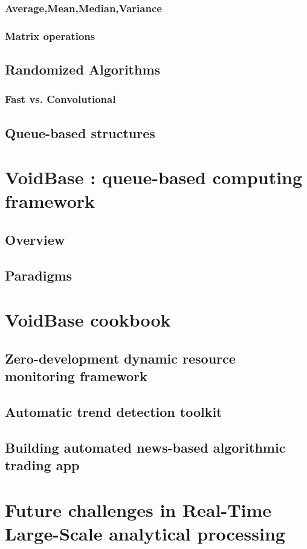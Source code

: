 \documentclass[]{book}    %
\begin{document}
\subsection{Average,Mean,Median,Variance}
\subsection{Matrix operations}

\section{Randomized Algorithms}
\subsection{Fast vs. Convolutional}
\section{Queue-based structures}

\chapter{VoidBase : queue-based computing framework}
\section{Overview}
\section{Paradigms}

\chapter{VoidBase cookbook}
\section{Zero-development dynamic resource monitoring framework}
\section{Automatic trend detection toolkit}
\section{Building automated news-based algorithmic trading app}

\chapter{Future challenges in Real-Time Large-Scale analytical processing}
\end{document}
